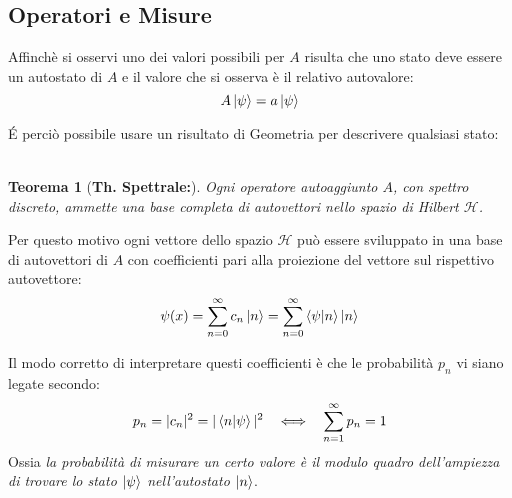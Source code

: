 \documentclass[twoside]{article}
\newtheorem{theorem}{Teorema}[section]
\begin{document}
\vspace{0.5cm}
\subsection{Operatori e Misure}

Affinchè si osservi uno dei valori possibili per $A$ risulta che uno stato deve essere un autostato di $A$ e il valore che si osserva è il relativo autovalore:
\begin{equation}
    A\ket{\psi} = a \ket{\psi}
\end{equation}

\'E perciò possibile usare un risultato di Geometria per descrivere qualsiasi stato:
\\
\\
\begin{theorem}[\textbf{Th. Spettrale:}] 
Ogni operatore autoaggiunto $A$, con spettro discreto, ammette una base
completa di autovettori nello spazio di Hilbert $\mathcal{H}$.
\end{theorem}
Per questo motivo ogni vettore dello spazio $\mathcal{H}$ può essere sviluppato in una base di autovettori di $A$ con coefficienti pari alla proiezione del vettore sul rispettivo autovettore:
\begin{equation}
    \psi(x)=\displaystyle\sum_{n=0}^{\infty} c_n \ket{n} = \displaystyle\sum_{n=0}^{\infty} \bra{\psi}\ket{n}\ket{n}
\end{equation}

Il modo corretto di interpretare questi coefficienti è che le probabilità $p_n$ vi siano legate secondo:
\begin{equation}
p_n=|c_n|^2=|\bra{n}\ket{\psi}|^2 \ \ \iff \ \ \sum_{n=1}^{\infty}p_n=1
\end{equation}
Ossia \textit{la probabilità di misurare un certo valore è il modulo quadro dell'ampiezza di trovare lo stato $\ket{\psi}$ nell'autostato $\ket{n}$}.


\vspace{0.5cm}
\end{document}
